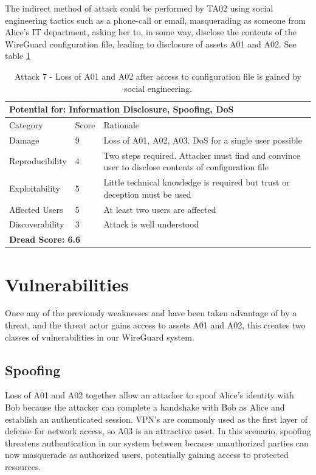 \documentclass [11pt, proquest] {uwthesis}[2020/02/24]
\begin{document}
The indirect method of attack could be performed by TA02 using social engineering tactics such as a phone-call or email, masquerading as someone from Alice's IT department, asking her to, in some way, disclose the contents of the WireGuard configuration file, leading to disclosure of assets A01 and A02.
See table \ref{ref:attack7} 

\begin{table}[H]
\begin{tabular}{|m{3cm}|m{.9cm}|p{27em} |}
\multicolumn{3}{l}{Potential for: Information Disclosure, Spoofing, DoS}                   \\
\hline
Category & Score & Rationale \\
\hline
Damage          & 9     & Loss of A01, A02, A03. DoS for a single user possible            \\
\hline
Reproducibility & 4     & Two steps required. Attacker must find and convince user to disclose contents of configuration file    \\
\hline
Exploitability & 5      & Little technical knowledge is required but trust or deception must be used   \\
\hline
Affected Users  & 5     & At least two users are affected                      \\
\hline
Discoverability & 3     & Attack is well understood  \\
\hline
\multicolumn{3}{l}{\textbf{Dread Score: 6.6}} 
\end{tabular}
\caption{Attack 7 - Loss of A01 and A02 after access to configuration file is gained by social engineering.}
\label{ref:attack7}
\end{table}

\section{Vulnerabilities}
Once any of the previously weaknesses and have been taken advantage of by a threat, and the threat actor gains access to assets A01 and A02, this creates two classes of vulnerabilities in our WireGuard system.

\subsection{Spoofing}
\label{spoofing}
Loss of A01 and A02 together allow an attacker to spoof Alice's identity with Bob because the attacker can complete a handshake with Bob as Alice and establish an authenticated session. VPN's are commonly used as the first layer of defense for network access, so A03 is an attractive asset.
In this scenario, spoofing threatens authentication in our system between because unauthorized parties can now masquerade as authorized users, potentially gaining access to protected resources. 
\end{document}

